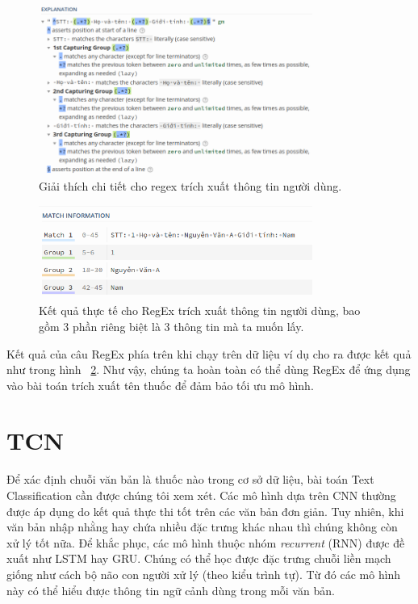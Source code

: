 \begin{figure}
\centering
\includegraphics[width=0.8\textwidth]{mep_img/regex_1.png}
\caption{Giải thích chi tiết cho regex trích xuất thông tin người dùng.}\label{regex_1}
\end{figure}

\begin{figure}
\centering
\includegraphics[width=0.8\textwidth]{mep_img/regex_2.png}
\caption{Kết quả thực tế cho RegEx trích xuất thông tin người dùng, bao gồm 3 phần riêng biệt là 3 thông tin mà ta muốn lấy.}\label{regex_2}
\end{figure}

Kết quả của câu RegEx phía trên khi chạy trên dữ liệu ví dụ cho ra được kết quả như trong hình ~\ref{regex_2}. Như vậy, chúng ta hoàn toàn có thể dùng RegEx để ứng dụng vào bài toán trích xuất tên thuốc để đảm bảo tối ưu mô hình. 

\section{TCN}

Để xác định chuỗi văn bản là thuốc nào trong cơ sở dữ liệu, bài toán Text Classification cần được chúng tôi xem xét. Các mô hình dựa trên CNN thường được áp dụng do kết quả thực thi tốt trên các văn bản đơn giản. Tuy nhiên, khi văn bản nhập nhằng hay chứa nhiều đặc trưng khác nhau thì chúng không còn xử lý tốt nữa. Để khắc phục, các mô hình thuộc nhóm \textit{recurrent} (RNN) được đề xuất như LSTM hay GRU. Chúng có thể học được đặc trưng chuỗi liền mạch giống như cách bộ não con người xử lý (theo kiểu trình tự). Từ đó các mô hình này có thể hiểu được thông tin ngữ cảnh dùng trong mỗi văn bản.

